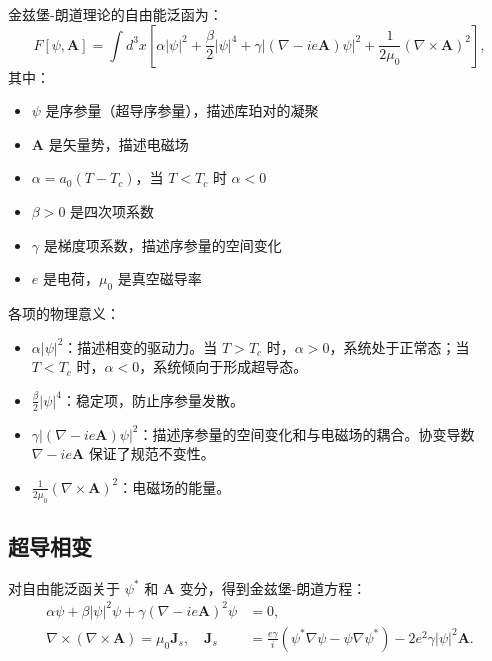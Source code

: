 \begin{definition}
金兹堡-朗道理论的自由能泛函为：
\begin{equation}
    F[\psi, \mathbf{A}] = \int d^3x \left[ \alpha|\psi|^2 + \frac{\beta}{2}|\psi|^4 + \gamma|(\nabla - ie\mathbf{A})\psi|^2 + \frac{1}{2\mu_0}(\nabla \times \mathbf{A})^2 \right],
\end{equation}
其中：
\begin{itemize}
    \item $\psi$ 是序参量（超导序参量），描述库珀对的凝聚
    \item $\mathbf{A}$ 是矢量势，描述电磁场
    \item $\alpha = a_0(T - T_c)$，当 $T < T_c$ 时 $\alpha < 0$
    \item $\beta > 0$ 是四次项系数
    \item $\gamma$ 是梯度项系数，描述序参量的空间变化
    \item $e$ 是电荷，$\mu_0$ 是真空磁导率
\end{itemize}
\end{definition}

\begin{remark}
各项的物理意义：
\begin{itemize}
    \item $\alpha|\psi|^2$：描述相变的驱动力。当 $T > T_c$ 时，$\alpha > 0$，系统处于正常态；当 $T < T_c$ 时，$\alpha < 0$，系统倾向于形成超导态。
    \item $\frac{\beta}{2}|\psi|^4$：稳定项，防止序参量发散。
    \item $\gamma|(\nabla - ie\mathbf{A})\psi|^2$：描述序参量的空间变化和与电磁场的耦合。协变导数 $\nabla - ie\mathbf{A}$ 保证了规范不变性。
    \item $\frac{1}{2\mu_0}(\nabla \times \mathbf{A})^2$：电磁场的能量。
\end{itemize}
\end{remark}

\subsection{超导相变}

\begin{theorem}
对自由能泛函关于 $\psi^*$ 和 $\mathbf{A}$ 变分，得到金兹堡-朗道方程：
\begin{align}
    \alpha \psi + \beta |\psi|^2 \psi + \gamma (\nabla - ie\mathbf{A})^2 \psi &= 0, \\
    \nabla \times (\nabla \times \mathbf{A}) = \mu_0 \mathbf{J}_s, \quad \mathbf{J}_s &= \frac{e\gamma}{i}(\psi^* \nabla \psi - \psi \nabla \psi^*) - 2e^2 \gamma |\psi|^2 \mathbf{A}.
\end{align}
\end{theorem}


